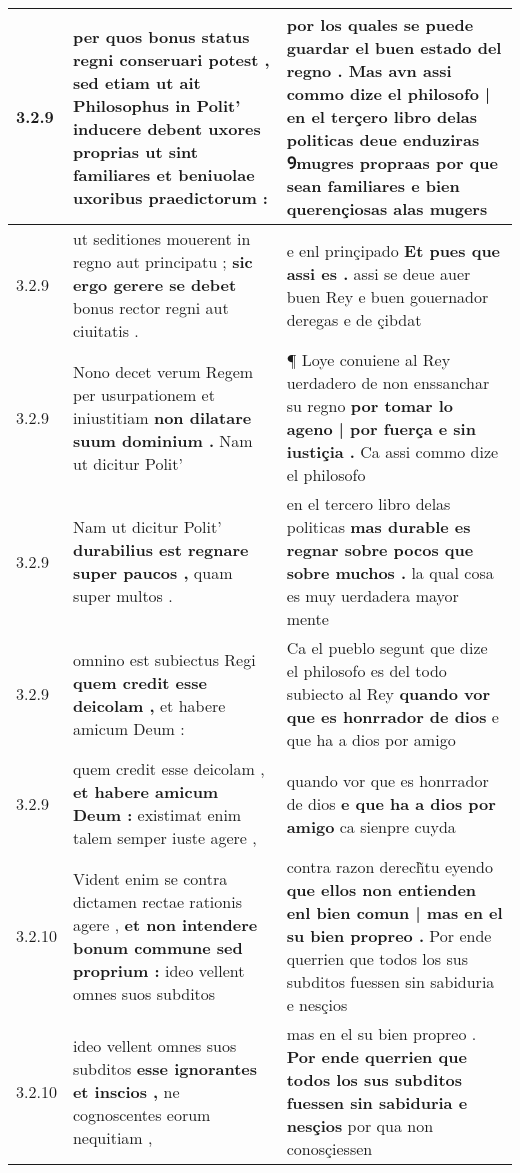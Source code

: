 \begin{tabular}{|p{1cm}|p{6.5cm}|p{6.5cm}|}
3.2.9 & per quos bonus status regni conseruari potest , \textbf{ sed etiam ut ait Philosophus in Polit’ inducere debent uxores proprias } ut sint familiares et beniuolae uxoribus praedictorum : & por los quales se puede guardar el buen estado del regno . \textbf{ Mas avn assi commo dize el philosofo | en el terçero libro delas politicas deue enduziras Ꝯmugres propraas } por que sean familiares e bien querençiosas alas mugers \\\hline
3.2.9 & ut seditiones mouerent in regno aut principatu ; \textbf{ sic ergo gerere se debet } bonus rector regni aut ciuitatis . & e enl prinçipado \textbf{ Et pues que assi es . } assi se deue auer buen Rey e buen gouernador deregas e de çibdat \\\hline
3.2.9 & Nono decet verum Regem per usurpationem et iniustitiam \textbf{ non dilatare suum dominium . } Nam ut dicitur Polit’ & ¶ Loye conuiene al Rey uerdadero de non enssanchar su regno \textbf{ por tomar lo ageno | por fuerça e sin iustiçia . } Ca assi commo dize el philosofo \\\hline
3.2.9 & Nam ut dicitur Polit’ \textbf{ durabilius est regnare super paucos , } quam super multos . & en el tercero libro delas politicas \textbf{ mas durable es regnar sobre pocos que sobre muchos . } la qual cosa es muy uerdadera mayor mente \\\hline
3.2.9 & omnino est subiectus Regi \textbf{ quem credit esse deicolam , } et habere amicum Deum : & Ca el pueblo segunt que dize el philosofo es del todo subiecto al Rey \textbf{ quando vor que es honrrador de dios } e que ha a dios por amigo \\\hline
3.2.9 & quem credit esse deicolam , \textbf{ et habere amicum Deum : } existimat enim talem semper iuste agere , & quando vor que es honrrador de dios \textbf{ e que ha a dios por amigo } ca sienpre cuyda \\\hline
3.2.10 & Vident enim se contra dictamen rectae rationis agere , \textbf{ et non intendere bonum commune sed proprium : } ideo vellent omnes suos subditos & contra razon derech̃tu eyendo \textbf{ que ellos non entienden enl bien comun | mas en el su bien propreo . } Por ende querrien que todos los sus subditos fuessen sin sabiduria e nesçios \\\hline
3.2.10 & ideo vellent omnes suos subditos \textbf{ esse ignorantes et inscios , } ne cognoscentes eorum nequitiam , & mas en el su bien propreo . \textbf{ Por ende querrien que todos los sus subditos fuessen sin sabiduria e nesçios } por qua non conosçiessen \\\hline

\end{tabular}
